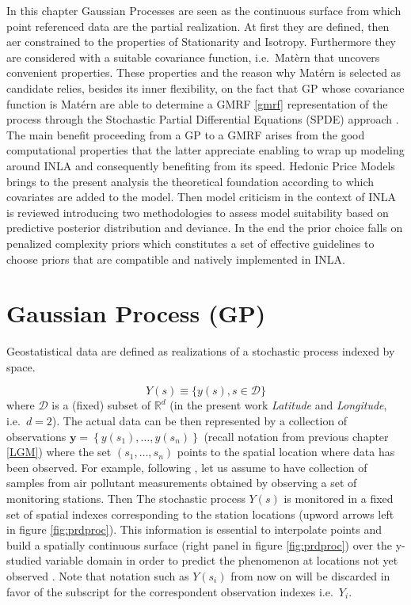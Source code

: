 \documentclass[
  12pt,
  a4paper,
  oneside]{book}
\theoremstyle{definition}
\theoremstyle{definition}
\theoremstyle{definition}
\theoremstyle{remark}
\begin{document}
In this chapter Gaussian Processes are seen as the continuous surface from which point referenced data are the partial realization. At first they are defined, then aer constrained to the properties of Stationarity and Isotropy. Furthermore they are considered with a suitable covariance function, i.e.~Matèrn that uncovers convenient properties. These properties and the reason why Matérn is selected as candidate relies, besides its inner flexibility, on the fact that GP whose covariance function is Matérn are able to determine a GMRF \ref{gmrf} representation of the process through the Stochastic Partial Differential Equations (SPDE) approach \citep{Lindgren2011}. The main benefit proceeding from a GP to a GMRF arises from the good computational properties that the latter appreciate enabling to wrap up modeling around INLA and consequently benefiting from its speed. Hedonic Price Models brings to the present analysis the theoretical foundation according to which covariates are added to the model. Then model criticism in the context of INLA is reviewed introducing two methodologies to assess model suitability based on predictive posterior distribution and deviance. In the end the prior choice falls on penalized complexity priors \citep{simpson2017} which constitutes a set of effective guidelines to choose priors that are compatible and natively implemented in INLA.

\hypertarget{GP}{%
\section{Gaussian Process (GP)}\label{GP}}

Geostatistical data are defined as realizations of a stochastic process indexed by space.

\[
Y(s) \equiv\{y(s), s \in \mathscr{D}\}
\]
where \(\mathscr{D}\) is a (fixed) subset of \(\mathbb{R}^{d}\) (in the present work \emph{Latitude} and \emph{Longitude}, i.e.~\(d=2\)). The actual data can be then represented by a collection of observations \(\boldsymbol{\mathbf{y}}=\left\{y\left(s_{1}\right), \ldots, y\left(s_{n}\right)\right\}\) (recall notation from previous chapter \ref{LGM}) where the set \(\left(s_{1}, \ldots, s_{n}\right)\) points to the spatial location where data has been observed. For example, following \citet{Cameletti2012}, let us assume to have collection of samples from air pollutant measurements obtained by observing a set of monitoring stations. Then The stochastic process \(Y(s)\) is monitored in a fixed set of spatial indexes corresponding to the station locations (upword arrows left in figure \ref{fig:prdproc}). This information is essential to interpolate points and build a spatially continuous surface (right panel in figure \ref{fig:prdproc}) over the y-studied variable domain in order to predict the phenomenon at locations not yet observed \citep{LecturePaci}. Note that notation such as \(Y(s_i)\) from now on will be discarded in favor of the subscript for the correspondent observation indexes i.e.~\(Y_i\).
\end{document}
